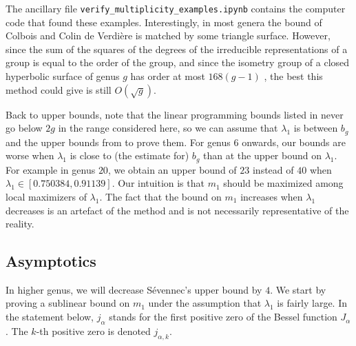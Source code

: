 \documentclass[12pt]{amsart}
\numberwithin{equation}{section}
\begin{document}
The ancillary file \texttt{verify\_multiplicity\_examples.ipynb} contains the computer code that found these examples. Interestingly, in most genera the bound of Colbois and Colin de Verdière is matched by some triangle surface. However, since the sum of the squares of the degrees of the irreducible representations of a group is equal to the order of the group, and since the isometry group of a closed hyperbolic surface of genus $g$ has order at most $168(g-1)$ \cite{Hurwitz}, the best this method could give is still $O(\sqrt{g})$.

Back to upper bounds, note that the linear programming bounds listed in  never go below $2g$ in the range considered here, so we can assume that $\lambda_1$ is between $b_g$ and the upper bounds from  to prove them. For genus $6$ onwards, our bounds are worse when $\lambda_1$ is close to (the estimate for) $b_g$ than at the upper bound on $\lambda_1$. For example in genus $20$, we obtain an upper bound of $23$ instead of $40$ when $\lambda_1 \in [0.750384 , 0.91139 ]$. Our intuition is that $m_1$ should be maximized among local maximizers of $\lambda_1$. The fact that the bound on $m_1$ increases when $\lambda_1$ decreases is an artefact of the method and is not necessarily representative of the reality.


\subsection{Asymptotics}

In higher genus, we will decrease Sévennec's upper bound by $4$. We start by proving a sublinear bound on $m_1$ under the assumption that $\lambda_1$ is fairly large. In the statement below, $j_\alpha$ stands for the first positive zero of the Bessel function $J_\alpha$. The $k$-th positive zero is denoted $j_{\alpha,k}$. 
\end{document}
